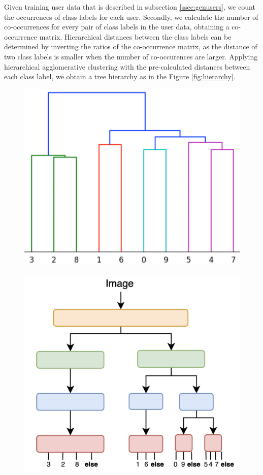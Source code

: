 Given training user data that is described in subsection \ref{ssec:genusers}, we count the occurrences of class labels for each user. 
Secondly, we calculate the number of co-occurrences for every pair of class labels in the user data, obtaining a co-occurrence matrix.
Hierarchical distances between the class labels can be determined by inverting the ratios of the co-occurrence matrix, 
as the distance of two class labels is smaller when the number of co-occurences are larger. 
Applying hierarchical agglomerative clustering with the pre-calculated distances between each class label, we obtain a tree hierarchy as in the Figure \ref{fig:hierarchy}.

\begin{figure}
    \centering
    \begin{minipage}[b]{.4\textwidth}
        \centering
        \includegraphics[width=.9\linewidth]{images/hierfig.png}
        \label{fig:sub1}
    \end{minipage}%
    \begin{minipage}[b]{.4\textwidth}
        \centering
        \includegraphics[width=.9\linewidth]{images/example_hier.png}

\end{minipage}
\end{figure}
